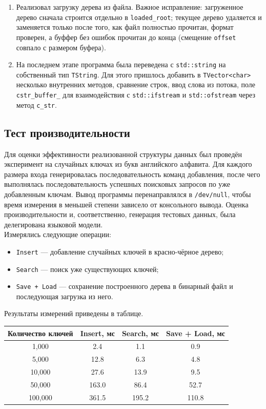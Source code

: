\documentclass[12pt]{article}
\begin{document}
\begin{enumerate}
\item Реализовал загрузку дерева из файла. Важное исправление: загруженное дерево сначала строится отдельно в \texttt{loaded\_root}; текущее дерево удаляется и заменяется только после того, как файл полностью прочитан, формат проверен, а буффер без ошибок прочитан до конца (смещение \texttt{offset} совпало с размером буфера).

\item На последнем этапе программа была переведена с \texttt{std::string} на собственный тип \texttt{TString}. Для этого пришлось добавить в \texttt{TVector<char>} несколько внутренних методов, сравнение строк, ввод слова из потока, поле \texttt{cstr\_buffer\_} для  взаимодействия с \texttt{std::ifstream} и \texttt{std::ofstream} через метод \texttt{c\_str}.
\end{enumerate}

\subsection*{Тест производительности}
\hspace{2ex}
Для оценки эффективности реализованной структуры данных был проведён эксперимент на случайных ключах из букв английского алфавита. Для каждого размера входа генерировалась последовательность команд добавления, после чего выполнялась последовательность успешных поисковых запросов по уже добавленным ключам. Вывод программы перенаправлялся в \texttt{/dev/null}, чтобы время измерения в меньшей степени зависело от консольного вывода. Оценка производительности и, соответственно, генерация тестовых данных, была делегирована языковой модели.\\

Измерялись следующие операции:
\begin{itemize}
\item \texttt{Insert} — добавление случайных ключей в красно-чёрное дерево;
\item \texttt{Search} — поиск уже существующих ключей;
\item \texttt{Save + Load} — сохранение построенного дерева в бинарный файл и последующая загрузка из него.
\end{itemize}

Результаты измерений приведены в таблице.

\begin{center}
\begin{tabular}{|c|c|c|c|}
\hline
\textbf{Количество ключей} & \textbf{Insert, мс} & \textbf{Search, мс} & \textbf{Save + Load, мс} \\
\hline
1,000 & 2.4 & 1.1 & 0.9 \\
5,000 & 12.8 & 6.3 & 4.8 \\
10,000 & 27.6 & 13.9 & 9.5 \\
50,000 & 163.0 & 86.4 & 52.7 \\
100,000 & 361.5 & 195.2 & 110.8 \\
\hline
\end{tabular}
\end{center}
\end{document}
